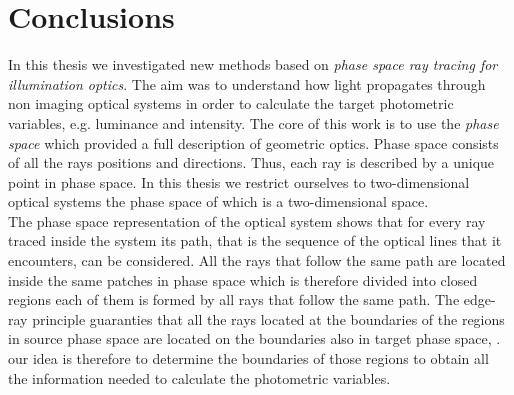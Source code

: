 \chapter{Conclusions}
In this thesis we investigated new methods based on \textit{phase space ray tracing for illumination optics}. The aim was to understand how light propagates through non imaging optical systems in order to calculate the target photometric variables, e.g. luminance and intensity. 
The core of this work is to use the \textit{phase space} which provided a full description of geometric optics. Phase space consists of all the rays positions and directions. Thus, each ray is described by a unique point in phase space. In this thesis we restrict ourselves to two-dimensional optical systems the phase space of which is a two-dimensional space. 
\\ \indent The phase space representation of the optical system shows that for every ray traced inside the system its path, that is the sequence of the optical lines that it encounters, can be considered. All the rays that follow the same path are located inside the same patches in phase space which is therefore divided into closed regions each of them is formed by all rays that follow the same path. The edge-ray principle guaranties that all the rays located at the boundaries of the regions in source phase space are located on the boundaries also in target phase space, \cite{Ries:2}. our idea is therefore to determine the boundaries of those regions to obtain all the information needed to calculate the photometric variables. %
